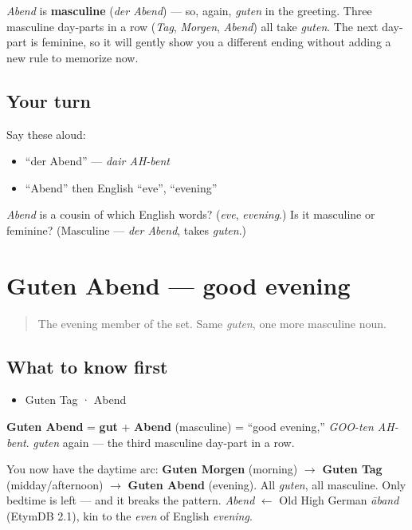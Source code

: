 \begin{grammarlens}[title={Grammar Lens}]
\emph{Abend} is \textbf{masculine} (\emph{der Abend}) — so, again, \emph{guten} in the greeting. Three masculine day-parts in a row (\emph{Tag}, \emph{Morgen}, \emph{Abend}) all take \emph{guten}. The next day-part is feminine, so it will gently show you a different ending without adding a new rule to memorize now.
\end{grammarlens}

\subsection*{Your turn}
Say these aloud:

\begin{itemize}
\raggedright
  \item \textquotedblleft{}der Abend\textquotedblright{} — \emph{dair AH-bent}
  \item \textquotedblleft{}Abend\textquotedblright{} then English \textquotedblleft{}eve\textquotedblright{}, \textquotedblleft{}evening\textquotedblright{}
\end{itemize}

\begin{tcolorbox}[breakable,colback=teal!4,colframe=teal!35!black,title={Before you move on}]
\emph{Abend} is a cousin of which English words? (\emph{eve}, \emph{evening}.) Is it masculine or feminine? (Masculine — \emph{der Abend}, takes \emph{guten}.)
\end{tcolorbox}
\section[Guten Abend]{Guten Abend — good evening}

\label{lesson:GE-C01-guten-abend}



\begin{quote}
The evening member of the set. Same \emph{guten}, one more masculine noun.
\end{quote}

\subsection*{What to know first}
\begin{itemize}
\raggedright
  \item Guten Tag · Abend
\end{itemize}

\begin{cousinweb}
\textbf{Guten Abend} = \textbf{gut} + \textbf{Abend} (masculine) = \textquotedblleft{}good evening,\textquotedblright{} \emph{GOO-ten AH-bent}. \emph{guten} again — the third masculine day-part in a row.

You now have the daytime arc: \textbf{Guten Morgen} (morning) $\to$ \textbf{Guten Tag} (midday/afternoon) $\to$ \textbf{Guten Abend} (evening). All \emph{guten}, all masculine. Only bedtime is left — and it breaks the pattern. \emph{Abend} $\leftarrow$ Old High German \emph{āband} (EtymDB 2.1), kin to the \emph{even} of English \emph{evening}.
\end{cousinweb}

